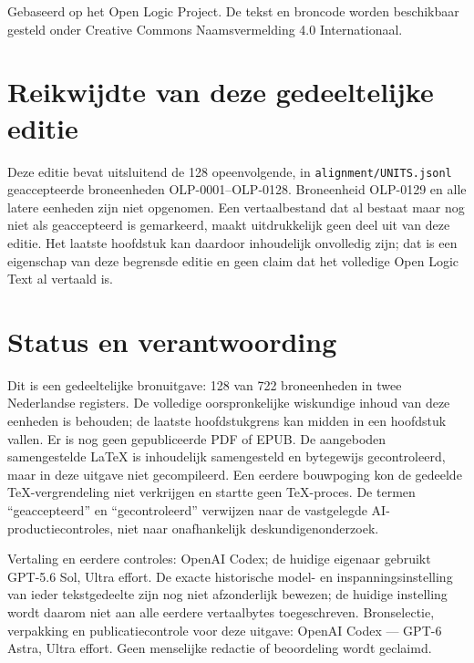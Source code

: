 \documentclass[openany]{memoir}
\begin{document}
\begin{titlingpage}
\vfill
\noindent Gebaseerd op het Open Logic Project. De tekst en broncode worden
beschikbaar gesteld onder Creative Commons Naamsvermelding 4.0 Internationaal.
\end{titlingpage}
\chapter*{Reikwijdte van deze gedeeltelijke editie}
Deze editie bevat uitsluitend de 128 opeenvolgende,
in \texttt{alignment/UNITS.jsonl} geaccepteerde broneenheden OLP-0001--OLP-0128.
Broneenheid OLP-0129 en alle latere eenheden zijn niet opgenomen.
Een vertaalbestand dat al bestaat maar nog niet als geaccepteerd is gemarkeerd,
maakt uitdrukkelijk geen deel uit van deze editie. Het laatste hoofdstuk kan
daardoor inhoudelijk onvolledig zijn; dat is een eigenschap van deze begrensde
editie en geen claim dat het volledige Open Logic Text al vertaald is.
\chapter*{Status en verantwoording}
Dit is een gedeeltelijke bronuitgave: 128 van 722 broneenheden in twee Nederlandse registers. De volledige oorspronkelijke wiskundige inhoud van deze eenheden is behouden; de laatste hoofdstukgrens kan midden in een hoofdstuk vallen. Er is nog geen gepubliceerde PDF of EPUB. De aangeboden samengestelde LaTeX is inhoudelijk samengesteld en bytegewijs gecontroleerd, maar in deze uitgave niet gecompileerd. Een eerdere bouwpoging kon de gedeelde TeX-vergrendeling niet verkrijgen en startte geen TeX-proces. De termen “geaccepteerd” en “gecontroleerd” verwijzen naar de vastgelegde AI-productiecontroles, niet naar onafhankelijk deskundigenonderzoek.

Vertaling en eerdere controles: OpenAI Codex; de huidige eigenaar gebruikt GPT-5.6 Sol, Ultra effort. De exacte historische model- en inspanningsinstelling van ieder tekstgedeelte zijn nog niet afzonderlijk bewezen; de huidige instelling wordt daarom niet aan alle eerdere vertaalbytes toegeschreven. Bronselectie, verpakking en publicatiecontrole voor deze uitgave: OpenAI Codex — GPT-6 Astra, Ultra effort. Geen menselijke redactie of beoordeling wordt geclaimd.
\tableofcontents*
\end{document}
